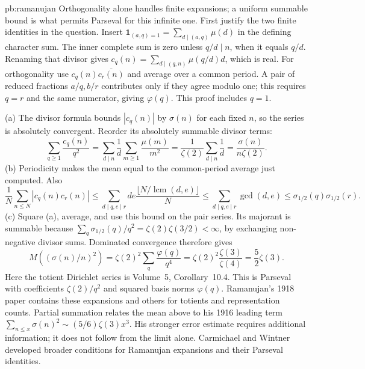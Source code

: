 \begin{solution}{pb:ramanujan}
\idea Orthogonality alone handles finite expansions; a uniform summable bound is what permits Parseval for this infinite one.
\writeup First justify the two finite identities in the question. Insert $\mathbf1_{(a,q)=1}=\sum_{d\mid(a,q)}\mu(d)$ in the defining character sum. The inner complete sum is zero unless $q/d\mid n$, when it equals $q/d$. Renaming that divisor gives $c_q(n)=\sum_{d\mid(q,n)}\mu(q/d)d$, which is real. For orthogonality use $c_q(n)\overline{c_r(n)}$ and average over a common period. A pair of reduced fractions $a/q,b/r$ contributes only if they agree modulo one; this requires $q=r$ and the same numerator, giving $\varphi(q)$. This proof includes $q=1$.

(a) The divisor formula bounds $|c_q(n)|$ by $\sigma(n)$ for each fixed $n$, so the series is absolutely convergent. Reorder its absolutely summable divisor terms:
\[\sum_{q\ge1}\frac{c_q(n)}{q^2}
 =\sum_{d\mid n}\frac1d\sum_{m\ge1}\frac{\mu(m)}{m^2}
 =\frac1{\zeta(2)}\sum_{d\mid n}\frac1d
 =\frac{\sigma(n)}{n\zeta(2)}.
\]
(b) Periodicity makes the mean equal to the common-period average just computed. Also
\[\frac1N\sum_{n\le N}|c_q(n)c_r(n)|
 \le\sum_{d\mid q,e\mid r}de\frac{\lfloor N/\operatorname{lcm}(d,e)\rfloor}{N}
 \le\sum_{d\mid q,e\mid r}\gcd(d,e)
 \le\sigma_{1/2}(q)\sigma_{1/2}(r).
\]
(c) Square (a), average, and use this bound on the pair series. Its majorant is summable because $\sum_q\sigma_{1/2}(q)/q^2=\zeta(2)\zeta(3/2)<\infty$, by exchanging non-negative divisor sums. Dominated convergence therefore gives
\[M((\sigma(n)/n)^2)=\zeta(2)^2\sum_q\frac{\varphi(q)}{q^4}
 =\zeta(2)^2\frac{\zeta(3)}{\zeta(4)}=\frac52\zeta(3).
\]
Here the totient Dirichlet series is Volume~5, Corollary~10.4. This is Parseval with coefficients $\zeta(2)/q^2$ and squared basis norms $\varphi(q)$.
\leads Ramanujan's 1918 paper contains these expansions and others for totients and representation counts. Partial summation relates the mean above to his 1916 leading term $\sum_{n\le x}\sigma(n)^2\sim(5/6)\zeta(3)x^3$. His stronger error estimate requires additional information; it does not follow from the limit alone. Carmichael and Wintner developed broader conditions for Ramanujan expansions and their Parseval identities.
\end{solution}


